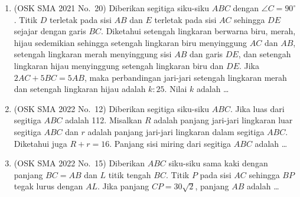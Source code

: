 \documentclass[12pt,a4paper]{article}
\begin{document}
\begin{enumerate}
\item (OSK SMA 2021 No.\ 20) Diberikan segitiga siku-siku $ABC$ dengan $\angle C=90^{\circ}$. Titik $D$ terletak pada sisi $AB$ dan $E$ terletak pada sisi $AC$ sehingga $DE$ sejajar dengan garis $BC$. Diketahui setengah lingkaran berwarna biru, merah, hijau sedemikian sehingga setengah lingkaran biru menyinggung $AC$ dan $AB$, setengah lingkaran merah menyinggung sisi $AB$ dan garis $DE$, dan setengah lingkaran hijau menyinggung setengah lingkaran biru dan $DE$. Jika $2AC+5BC=5AB$, maka perbandingan jari-jari setengah lingkaran merah dan setengah lingkaran hijau adalah $k : 25$. Nilai $k$ adalah \dots

\begin{figure}[H]
    \centering
\end{figure}

\item (OSK SMA 2022 No.\ 12) Diberikan segitiga siku-siku $ABC$. Jika luas dari segitiga $ABC$ adalah 112. Misalkan $R$ adalah panjang jari-jari lingkaran luar segitiga $ABC$ dan $r$ adalah panjang jari-jari lingkaran dalam segitiga $ABC$. Diketahui juga $R+r=16$. Panjang sisi miring dari segitiga $ABC$ adalah \dots

\item (OSK SMA 2022 No.\ 15) Diberikan $ABC$ siku-siku sama kaki dengan panjang $BC=AB$ dan $L$ titik tengah $BC$. Titik $P$ pada sisi $AC$ sehingga $BP$ tegak lurus dengan $AL$. Jika panjang $CP=30\sqrt{2}$, panjang $AB$ adalah \dots


\end{enumerate}
\end{document}

